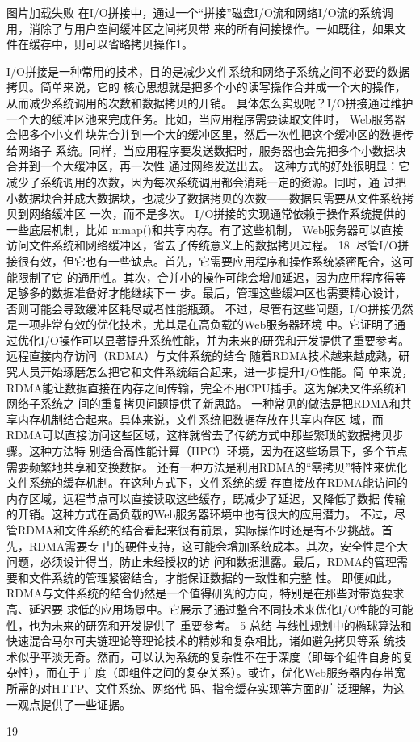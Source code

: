       图片加载失败
在I/O拼接中，通过一个“拼接”磁盘I/O流和网络I/O流的系统调用，消除了与用户空间缓冲区之间拷贝带
来的所有间接操作。一如既往，如果文件在缓存中，则可以省略拷贝操作1。

I/O拼接是一种常用的技术，目的是减少文件系统和网络子系统之间不必要的数据拷贝。简单来说，它的
核心思想就是把多个小的读写操作合并成一个大的操作，从而减少系统调用的次数和数据拷贝的开销。
具体怎么实现呢？I/O拼接通过维护一个大的缓冲区池来完成任务。比如，当应用程序需要读取文件时，
Web服务器会把多个小文件块先合并到一个大的缓冲区里，然后一次性把这个缓冲区的数据传给网络子
系统。同样，当应用程序要发送数据时，服务器也会先把多个小数据块合并到一个大缓冲区，再一次性
通过网络发送出去。
这种方式的好处很明显：它减少了系统调用的次数，因为每次系统调用都会消耗一定的资源。同时，通
过把小数据块合并成大数据块，也减少了数据拷贝的次数——数据只需要从文件系统拷贝到网络缓冲区
一次，而不是多次。
I/O拼接的实现通常依赖于操作系统提供的一些底层机制，比如 ﻿mmap()﻿和共享内存。有了这些机制，
Web服务器可以直接访问文件系统和网络缓冲区，省去了传统意义上的数据拷贝过程。
                                                  18
尽管I/O拼接很有效，但它也有一些缺点。首先，它需要应用程序和操作系统紧密配合，这可能限制了它
的通用性。其次，合并小的操作可能会增加延迟，因为应用程序得等足够多的数据准备好才能继续下一
步。最后，管理这些缓冲区也需要精心设计，否则可能会导致缓冲区耗尽或者性能瓶颈。
不过，尽管有这些问题，I/O拼接仍然是一项非常有效的优化技术，尤其是在高负载的Web服务器环境
中。它证明了通过优化I/O操作可以显著提升系统性能，并为未来的研究和开发提供了重要参考。
远程直接内存访问（RDMA）与文件系统的结合
随着RDMA技术越来越成熟，研究人员开始琢磨怎么把它和文件系统结合起来，进一步提升I/O性能。简
单来说，RDMA能让数据直接在内存之间传输，完全不用CPU插手。这为解决文件系统和网络子系统之
间的重复拷贝问题提供了新思路。
一种常见的做法是把RDMA和共享内存机制结合起来。具体来说，文件系统把数据存放在共享内存区
域，而RDMA可以直接访问这些区域，这样就省去了传统方式中那些繁琐的数据拷贝步骤。这种方法特
别适合高性能计算（HPC）环境，因为在这些场景下，多个节点需要频繁地共享和交换数据。
还有一种方法是利用RDMA的“零拷贝”特性来优化文件系统的缓存机制。在这种方式下，文件系统的缓
存直接放在RDMA能访问的内存区域，远程节点可以直接读取这些缓存，既减少了延迟，又降低了数据
传输的开销。这种方式在高负载的Web服务器环境中也有很大的应用潜力。
不过，尽管RDMA和文件系统的结合看起来很有前景，实际操作时还是有不少挑战。首先，RDMA需要专
门的硬件支持，这可能会增加系统成本。其次，安全性是个大问题，必须设计得当，防止未经授权的访
问和数据泄露。最后，RDMA的管理需要和文件系统的管理紧密结合，才能保证数据的一致性和完整
性。
即便如此，RDMA与文件系统的结合仍然是一个值得研究的方向，特别是在那些对带宽要求高、延迟要
求低的应用场景中。它展示了通过整合不同技术来优化I/O性能的可能性，也为未来的研究和开发提供了
重要参考。
5 总结
与线性规划中的椭球算法和快速混合马尔可夫链理论等理论技术的精妙和复杂相比，诸如避免拷贝等系
统技术似乎平淡无奇。然而，可以认为系统的复杂性不在于深度（即每个组件自身的复杂性），而在于
广度（即组件之间的复杂关系）。或许，优化Web服务器内存带宽所需的对HTTP、文件系统、网络代
码、指令缓存实现等方面的广泛理解，为这一观点提供了一些证据。




                                              19
